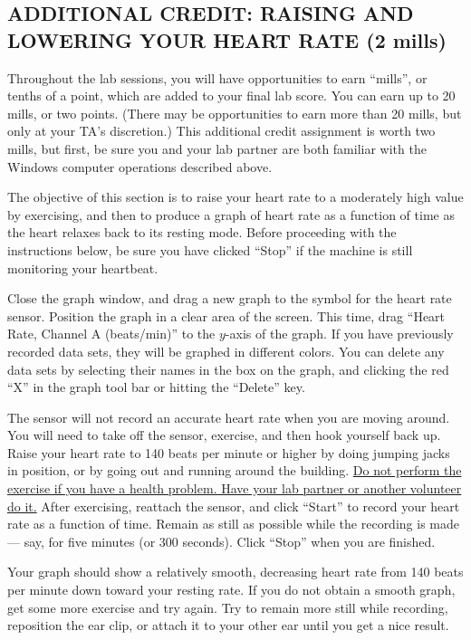\subsection*{ADDITIONAL CREDIT: RAISING AND LOWERING YOUR HEART RATE (2 mills)}

Throughout the lab sessions, you will have opportunities to earn ``mills'', or tenths of a point, which are added to your final lab score.  You can earn up to 20 mills, or two points.  (There may be opportunities to earn more than 20 mills, but only at your TA's discretion.)  This additional credit assignment is worth two mills, but first, be sure you and your lab partner are both familiar with the Windows computer operations described above.

The objective of this section is to raise your heart rate to a moderately high value by exercising, and then to produce a graph of heart rate as a function of time as the heart relaxes back to its resting mode.  Before proceeding with the instructions below, be sure you have clicked ``Stop'' if the machine is still monitoring your heartbeat.

Close the graph window, and drag a new graph to the symbol for the heart rate sensor.  Position the graph in a clear area of the screen.  This time, drag ``Heart Rate, Channel A (beats/min)'' to the \(y\)-axis of the graph.  If you have previously recorded data sets, they will be graphed in different colors.  You can delete any data sets by selecting their names in the box on the graph, and clicking the red ``X'' in the graph tool bar or hitting the ``Delete'' key.

The sensor will not record an accurate heart rate when you are moving around.  You will need to take off the sensor, exercise, and then hook yourself back up.  Raise your heart rate to 140 beats per minute or higher by doing jumping jacks in position, or by going out and running around the building.  \ul{Do not perform the exercise if you have a health problem.  Have your lab partner or another volunteer do it.}  After exercising, reattach the sensor, and click ``Start'' to record your heart rate as a function of time.  Remain as still as possible while the recording is made --- say, for five minutes (or 300 seconds).  Click ``Stop'' when you are finished.

Your graph should show a relatively smooth, decreasing heart rate from 140 beats per minute down toward your resting rate.  If you do not obtain a smooth graph, get some more exercise and try again.  Try to remain more still while recording, reposition the ear clip, or attach it to your other ear until you get a nice result.

